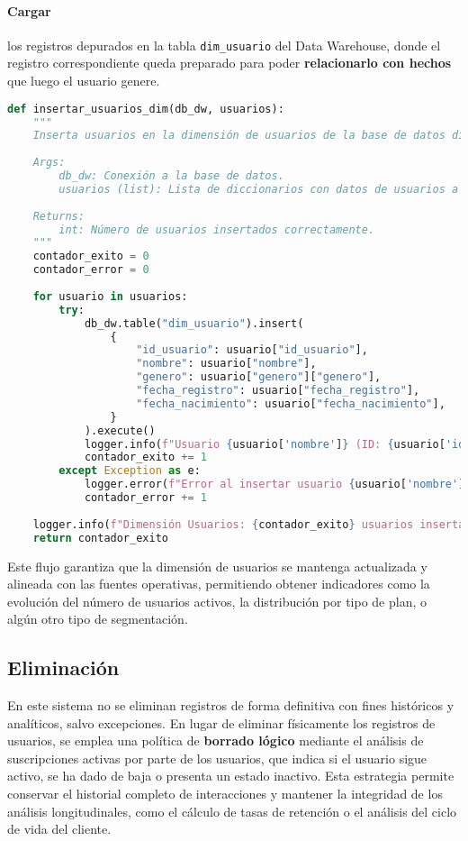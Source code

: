 \paragraph{Cargar} los registros depurados en la tabla \texttt{dim\_usuario} del Data Warehouse, donde el registro correspondiente queda preparado para poder {\bfseries relacionarlo con hechos} que luego el usuario genere.

\begin{lstlisting}[language=Python]
    def insertar_usuarios_dim(db_dw, usuarios):
    """
    Inserta usuarios en la dimensión de usuarios de la base de datos dimensional.
    
    Args:
        db_dw: Conexión a la base de datos.
        usuarios (list): Lista de diccionarios con datos de usuarios a insertar.
        
    Returns:
        int: Número de usuarios insertados correctamente.
    """
    contador_exito = 0
    contador_error = 0
    
    for usuario in usuarios:
        try:
            db_dw.table("dim_usuario").insert(
                {
                    "id_usuario": usuario["id_usuario"],
                    "nombre": usuario["nombre"],
                    "genero": usuario["genero"]["genero"],
                    "fecha_registro": usuario["fecha_registro"],
                    "fecha_nacimiento": usuario["fecha_nacimiento"],
                }
            ).execute()
            logger.info(f"Usuario {usuario['nombre']} (ID: {usuario['id_usuario']}) insertado en dim_usuario.")
            contador_exito += 1
        except Exception as e:
            logger.error(f"Error al insertar usuario {usuario['nombre']} (ID: {usuario['id_usuario']}) en dim_usuario: {e}")
            contador_error += 1
    
    logger.info(f"Dimensión Usuarios: {contador_exito} usuarios insertados, {contador_error} errores.")
    return contador_exito
\end{lstlisting}

Este flujo garantiza que la dimensión de usuarios se mantenga actualizada y alineada con las fuentes operativas, permitiendo obtener indicadores como la evolución del número de usuarios activos, la distribución por tipo de plan, o algún otro tipo de segmentación.

\subsection{Eliminación}
En este sistema no se eliminan registros de forma definitiva con fines históricos y analíticos, salvo excepciones. En lugar de eliminar físicamente los registros de usuarios, se emplea una política de {\bfseries borrado lógico} mediante el análisis de suscripciones activas por parte de los usuarios, que indica si el usuario sigue activo, se ha dado de baja o presenta un estado inactivo. Esta estrategia permite conservar el historial completo de interacciones y mantener la integridad de los análisis longitudinales, como el cálculo de tasas de retención o el análisis del ciclo de vida del cliente.


